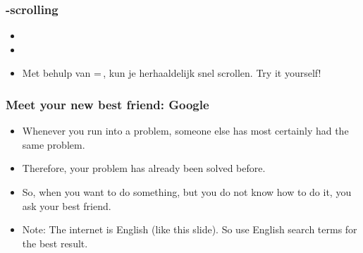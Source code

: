 \begin{frame}
\frametitle{\tiALPHA-scrolling}



\begin{itemize}
  \item<1-> 
  \item<2-> 
  \item<3-> Met behulp van \tiSecond\tiALPHA=\tiALOCK\,, kun je herhaaldelijk snel scrollen. Try it yourself!
\end{itemize}

\end{frame}




\begin{frame}
\frametitle{Meet your new best friend: Google}

\begin{itemize}
  \item<1-> Whenever you run into a problem, someone else has most certainly had the same problem.
  \item<2-> Therefore, your problem has already been solved before.
  \item<3-> So, when you want to do something, but you do not know how to do it, you ask your best friend.
  \item<4-> Note: The internet is English (like this slide). So use English search terms for the best result.
\end{itemize}


\end{frame}



